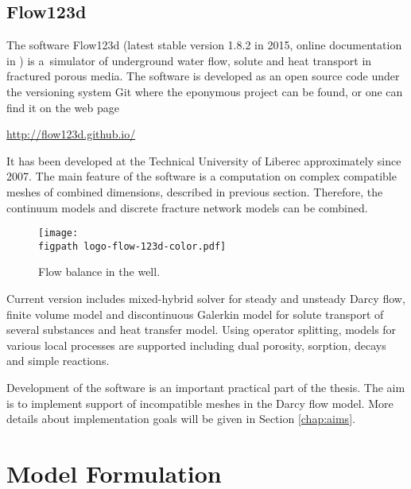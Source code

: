 \documentclass[dvipsnames,FM,Dis]{tulthesis}
\newcommand{\figpath}{figures/}
\begin{document}
\section{Flow123d} \label{sec:soa_flow123d}

The software Flow123d (latest stable version 1.8.2 in 2015, online documentation in \cite{flow123d_doc_2015}) 
is a~simulator of underground water flow, solute and heat transport in fractured porous media. The software is
developed as an open source code under the versioning system Git where the eponymous project can be found, or 
one can find it on the web page
\begin{center}
\url{http://flow123d.github.io/}
\end{center}
It has been developed at the Technical University of Liberec approximately since 2007.
The main feature of the software is a computation on complex compatible meshes of combined dimensions, described in
previous section. Therefore, the continuum models and discrete fracture network models can be combined.
%
\begin{figure}[!htb]
  \centering
  \texttt{[image: \\figpath logo-flow-123d-color.pdf]}
  \caption{Flow balance in the well.}
  \label{fig:logo_flow123d}
\end{figure}
%
Current version includes mixed-hybrid solver for steady and unsteady Darcy flow, finite volume model 
and discontinuous Galerkin model for solute transport of several substances and heat transfer model. 
Using operator splitting, models for various local processes are supported including dual porosity, sorption, decays 
and simple reactions.


Development of the software is an important practical part of the thesis. The aim is to implement support 
of incompatible meshes in the Darcy flow model. More details about implementation goals will be given in
Section \ref{chap:aims}.




\chapter{Model Formulation} \label{chap:results}



\end{document}
